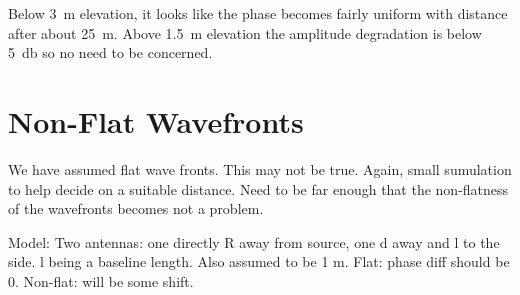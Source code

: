 Below \SI{3}{\meter} elevation, it looks like the phase becomes fairly uniform with distance after about \SI{25}{\meter}. Above \SI{1.5}{\meter} elevation the amplitude degradation is below \SI{5}{\decibel} so no need to be concerned.

\section{Non-Flat Wavefronts}
We have assumed flat wave fronts. This may not be true. Again, small sumulation to help decide on a suitable distance. Need to be far enough that the non-flatness of the wavefronts becomes not a problem.

Model: Two antennas: one directly R away from source, one d away and l to the side. l being a baseline length. Also assumed to be 1 m. 
Flat: phase diff should be 0.
Non-flat: will be some shift.
